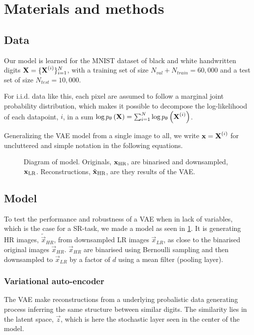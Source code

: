 \section{Materials and methods}
\label{sec:method}

\subsection{Data}
\label{sub:data}
Our model is learned for the MNIST dataset \cite{MNIST} of black and white handwritten digits $\bm{\mathrm{X}} = \{\bm{\mathrm{X}}^{(i)}\}^N_{i=1}$, with a training set of size $N_{val} + N_{train} = 60,000$ and a test set of size $N_{test}=10,000$.  

For i.i.d. data like this, each pixel are assumed to follow a marginal joint probability distribution, which makes it possible to decompose the log-likelihood of each datapoint, $i$, in a sum $\log p_{\theta}\left(\bm{\mathrm{X}}\right) = \sum^N_{i=1} \log p_{\theta}\left(\bm{\mathrm{X}}^{(i)}\right)$. 


Generalizing the VAE model from a single image to all, we write $\bm{\mathrm{x}} = \bm{\mathrm{X}}^{(i)}$ for uncluttered and simple notation in the following equations.

\begin{figure*}
	\centering
	
	\caption{Diagram of model. Originals, $\bm{\mathrm{x}}_{\text{HR}}$, are binarised and downsampled, $\bm{\mathrm{x}}_{\text{LR}}$. Reconstructions, $\tilde{\bm{\mathrm{x}}}_{\text{HR}}$, are they results of the VAE.}
	\label{fig:diagram}
\end{figure*}


\subsection{Model}
\label{sub:the_model}

To test the performance and robustness of a VAE when in lack of variables, which is the case for a SR-task, we made a model as seen in \ref{fig:diagram}. It is generating HR images, $\tilde{\vec{x}}_{HR}$, from downsampled LR images $\vec{x}_{LR}$, as close to the binarised original images $\vec{x}_{HR}$. $\vec{x}_{HR}$ are binarised using Bernoulli sampling and then downsampled to $\vec{x}_{LR}$ by a factor of $d$ using a mean filter (pooling layer).

\subsubsection{Variational auto-encoder}
\label{ssub:vae}
The VAE make reconstructions from a underlying probalistic data generating process inferring the same structure between similar digits. The similarity lies in the latent space, $\vec{z}$, which is here the stochastic layer seen in the center of the model. 

